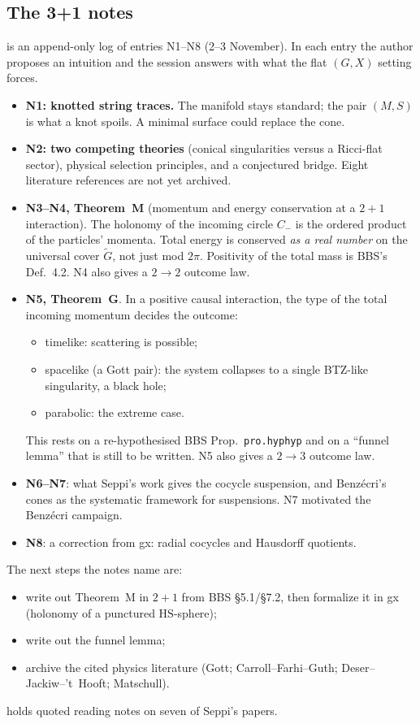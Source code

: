 \subsection{The 3+1 notes}

 is an append-only log of entries N1--N8 (2--3 November). In each
entry the author proposes an intuition and the session answers with what the flat $(G,X)$ setting
forces.
\begin{itemize}
\item \textbf{N1: knotted string traces.} The manifold stays standard; the pair $(M,S)$ is what a
  knot spoils. A minimal surface could replace the cone\unv.
\item \textbf{N2: two competing theories} (conical singularities versus a Ricci-flat sector),
  physical selection principles, and a conjectured bridge\unv. Eight literature references are
  not yet archived.
\item \textbf{N3--N4, Theorem~M} (momentum and energy conservation at a $2+1$ interaction)\unv.
  The holonomy of the incoming circle $C_-$ is the ordered product of the particles' momenta.
  Total energy is conserved \emph{as a real number} on the universal cover $\widetilde G$, not
  just mod $2\pi$. Positivity of the total mass is BBS's Def.~4.2. N4 also gives a $2\to2$
  outcome law.
\item \textbf{N5, Theorem~G}\unv. In a positive causal interaction, the type of the total
  incoming momentum decides the outcome:
  \begin{itemize}
  \item timelike: scattering is possible;
  \item spacelike (a Gott pair): the system collapses to a single BTZ-like singularity, a black
    hole;
  \item parabolic: the extreme case.
  \end{itemize}
  This rests on a re-hypothesised BBS Prop.~\texttt{pro.hyphyp} and on a ``funnel lemma'' that is
  still to be written. N5 also gives a $2\to3$ outcome law.
\item \textbf{N6--N7}: what Seppi's work gives the cocycle suspension, and Benzécri's cones as
  the systematic framework for suspensions. N7 motivated the Benzécri campaign.
\item \textbf{N8}: a correction from gx: radial cocycles and Hausdorff quotients.
\end{itemize}
The next steps the notes name are:
\begin{itemize}
\item write out Theorem~M in $2+1$ from BBS §5.1/§7.2, then formalize it in gx (holonomy of a
  punctured $\mathrm{HS}$-sphere);
\item write out the funnel lemma;
\item archive the cited physics literature (Gott; Carroll--Farhi--Guth; Deser--Jackiw--'t~Hooft;
  Matschull).
\end{itemize}
 holds quoted reading notes on seven of Seppi's papers.

